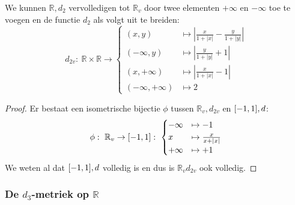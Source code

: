 \documentclass[main.tex]{subfiles}
\begin{document}
\begin{vb}
  We kunnen $\mathbb{R},d_{2}$ vervolledigen tot $\mathbb{R}_{v}$ door twee elementen $+\infty$ en $-\infty$ toe te voegen en de functie $d_{2}$ als volgt uit te breiden:
  \[ d_{2v}:\ \mathbb{R}\times\mathbb{R}\rightarrow
  \begin{cases}
    (x,y) &\mapsto \left| \frac{x}{1+|x|} - \frac{y}{1+|y|}  \right| \\
    (-\infty,y) &\mapsto \left| \frac{y}{1+|y|} +1\right|\\
    (x,+\infty) &\mapsto \left| \frac{x}{1+|x|} -1\right|\\
    (-\infty,+\infty) &\mapsto 2
  \end{cases}
  \]

  \begin{proof}
    Er bestaat een isometrische bijectie $\phi$ tussen $\mathbb{R}_{v},d_{2v}$ en $\interval{-1}{1},d$:
    \[
    \phi:\ \mathbb{R}_{v} \rightarrow \interval{-1}{1}:\ 
    \begin{cases}
      -\infty &\mapsto -1\\
      x &\mapsto \frac{x}{x+|x|}\\
      +\infty &\mapsto +1\\
    \end{cases}
    \]
    We weten al dat $\interval{-1}{1},d$ volledig is en dus is $\mathbb{R}_{v}d_{2v}$ ook volledig.
  \end{proof}
\end{vb}



\subsubsection{De $d_3$-metriek op $\mathbb{R}$}
\label{sec:d_3-metriek-op}
\end{document}
